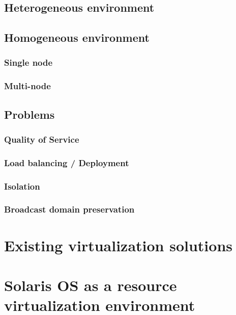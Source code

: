 \documentclass[11pt]{book}
\begin{document}
      \section{Heterogeneous environment}


      \section{Homogeneous environment}

        \subsection{Single node}


        \subsection{Multi-node}


    \section{Problems}

      \subsection{Quality of Service}


      \subsection{Load balancing / Deployment}


      \subsection{Isolation}


      \subsection{Broadcast domain preservation}


  \chapter{Existing virtualization solutions}


  \chapter{Solaris OS as a resource virtualization environment}
\end{document}
